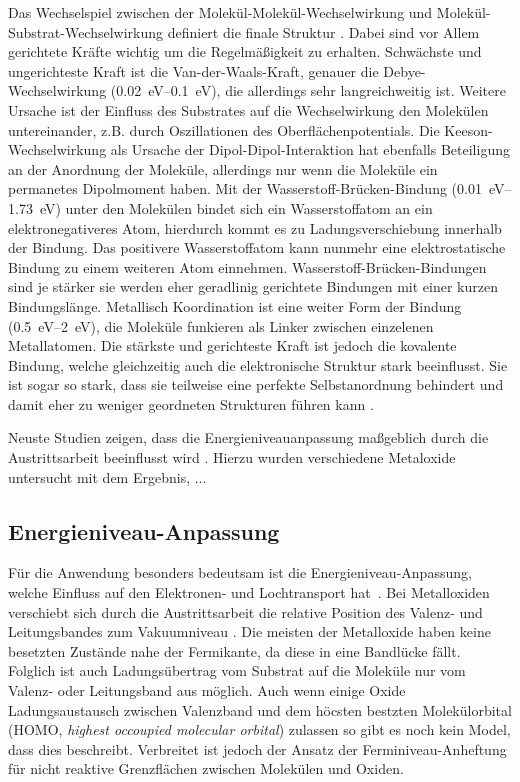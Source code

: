             Das Wechselspiel zwischen der Molekül-Molekül-Wechselwirkung und Molekül-Substrat-Wechselwirkung definiert die finale Struktur \cite{IF_1}.
            Dabei sind vor Allem gerichtete Kräfte wichtig um die Regelmäßigkeit zu erhalten.
            Schwächste und ungerichteste Kraft ist die Van-der-Waals-Kraft, genauer die Debye-Wechselwirkung (\SIrange{0.02}{0.1}{\electronvolt}), die allerdings sehr langreichweitig ist.
            Weitere Ursache ist der Einfluss des Substrates auf die Wechselwirkung den Molekülen untereinander, z.B. durch Oszillationen des Oberflächenpotentials.
            Die Keeson-Wechselwirkung als Ursache der Dipol-Dipol-Interaktion hat ebenfalls Beteiligung an der Anordnung der Moleküle, allerdings nur wenn die Moleküle ein permanetes Dipolmoment haben.
            Mit der Wasserstoff-Brücken-Bindung (\SIrange{0.01}{1.73}{\electronvolt}) unter den Molekülen bindet sich ein Wasserstoffatom an ein elektronegativeres Atom, hierdurch kommt es zu Ladungsverschiebung innerhalb der Bindung.
            Das positivere Wasserstoffatom kann nunmehr eine elektrostatische Bindung zu einem weiteren Atom einnehmen.
            Wasserstoff-Brücken-Bindungen sind je stärker sie werden eher geradlinig gerichtete Bindungen mit einer kurzen Bindungslänge.
            Metallisch Koordination ist eine weiter Form der Bindung (\SIrange{0.5}{2}{\electronvolt}), die Moleküle funkieren als Linker zwischen einzelenen Metallatomen.
            Die stärkste und gerichteste Kraft ist jedoch die kovalente Bindung, welche gleichzeitig auch die elektronische Struktur stark beeinflusst.
            Sie ist sogar so stark, dass sie teilweise eine perfekte Selbstanordnung behindert und damit eher zu weniger geordneten Strukturen führen kann \cite{IF_1}.

            Neuste Studien zeigen, dass die Energieniveauanpassung maßgeblich durch die Austrittsarbeit beeinflusst wird \cite{IF_3}.
            Hierzu wurden verschiedene Metaloxide untersucht mit dem Ergebnis, ...

        \subsection{Energieniveau-Anpassung}
            Für die Anwendung besonders bedeutsam ist die Energieniveau-Anpassung, welche Einfluss auf den Elektronen- und Lochtransport hat~\cite{IF_4}.
            Bei Metalloxiden verschiebt sich durch die Austrittsarbeit die relative Position des Valenz- und Leitungsbandes zum Vakuumniveau \cite{IF_3}.
            Die meisten der Metalloxide haben keine besetzten Zustände nahe der Fermikante, da diese in eine Bandlücke fällt.
            Folglich ist auch Ladungsübertrag vom Substrat auf die Moleküle nur vom Valenz- oder Leitungsband aus möglich.
            Auch wenn einige Oxide Ladungsaustausch zwischen Valenzband und dem höcsten bestzten Molekülorbital (HOMO, \textit{highest occoupied molecular orbital}) zulassen so  gibt es noch kein Model, dass dies beschreibt.
            Verbreitet ist jedoch der Ansatz der Ferminiveau-Anheftung für nicht reaktive Grenzflächen zwischen Molekülen und Oxiden.

